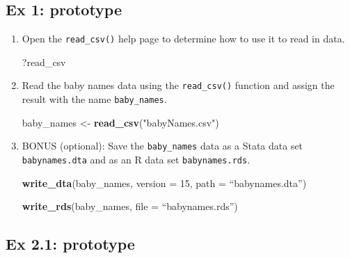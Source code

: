 \documentclass[]{book}
\newenvironment{Shaded}{\begin{snugshade}}{\end{snugshade}}
\newcommand{\KeywordTok}[1]{\textcolor[rgb]{0.13,0.29,0.53}{\textbf{#1}}}
\newcommand{\DataTypeTok}[1]{\textcolor[rgb]{0.13,0.29,0.53}{#1}}
\newcommand{\DecValTok}[1]{\textcolor[rgb]{0.00,0.00,0.81}{#1}}
\newcommand{\StringTok}[1]{\textcolor[rgb]{0.31,0.60,0.02}{#1}}
\newcommand{\NormalTok}[1]{#1}
\begin{document}
\subsection{Ex 1: prototype}\label{ex-1-prototype}

\begin{enumerate}
\def\labelenumi{\arabic{enumi}.}
\item
  Open the \texttt{read\_csv()} help page to determine how to use it to
  read in data.

\begin{Shaded}
\begin{Highlighting}[]
\NormalTok{?read_csv}
\end{Highlighting}
\end{Shaded}
\item
  Read the baby names data using the \texttt{read\_csv()} function and
  assign the result with the name \texttt{baby\_names}.

\begin{Shaded}
\begin{Highlighting}[]
\NormalTok{baby_names <-}\StringTok{ }\KeywordTok{read_csv}\NormalTok{(}\StringTok{"babyNames.csv"}\NormalTok{)}
\end{Highlighting}
\end{Shaded}
\item
  BONUS (optional): Save the \texttt{baby\_names} data as a Stata data
  set \texttt{babynames.dta} and as an R data set
  \texttt{babynames.rds}.

\begin{Shaded}
\begin{Highlighting}[]
\KeywordTok{write_dta}\NormalTok{(baby_names, }\DataTypeTok{version =} \DecValTok{15}\NormalTok{, }\DataTypeTok{path =}\NormalTok{ “babynames.dta”)}

\KeywordTok{write_rds}\NormalTok{(baby_names, }\DataTypeTok{file =}\NormalTok{ “babynames.rds”)}
\end{Highlighting}
\end{Shaded}
\end{enumerate}

\subsection{Ex 2.1: prototype}\label{ex-2.1-prototype}
\end{document}

